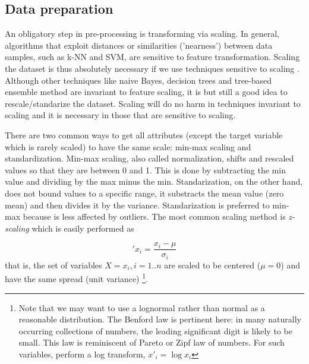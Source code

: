 \documentclass[11pt]{article}
\begin{document}
\subsection{Data preparation}
\label{sse:daprep}

An obligatory step in pre-processing is transforming via scaling. 
In general, algorithms that exploit distances or similarities ('nearness') between data samples, such as k-NN and SVM, are sensitive to feature transformation. 
Scaling the dataset is thus absolutely necessary if we use techniques sensitive to scaling \cite{wu2012foundations}. Although other techniques like naive Bayes, decision trees and tree-based ensemble method are invariant to feature scaling, it is but still a good idea to rescale/standarize the dataset. Scaling will do no harm in techniques invariant to scaling and it is necessary in those that are sensitive to scaling. 

There are two common ways to get all attributes (except the target variable which is rarely scaled) to have the same scale: min-max scaling and standardization.
Min-max scaling, also called normalization, shifts and rescaled values so that they are between 0 and 1. This is done by subtracting the min value and dividing by the max minus the min. 
Standarization, on the other hand, does not bound values to a specific range, it substracts the mean value (zero mean) and then divides it by the variance. 
Standarization is preferred to min-max because is less affected by outliers. The most common scaling method is \emph{z-scaling} which is easily performed as 

\begin{equation} \label{eq:scaling}
\prime{x}_i=\frac{x_i -\mu}{\sigma_i}
\end{equation}
that is, the set of variables $X = x_i, i=1..n$ are scaled to be centered ($\mu=0$) and have the same spread (unit variance) \footnote{Note that we may want to use a lognormal rather than normal as a reasonable distribution. The Benford law is pertinent here: in many naturally occurring collections of numbers, the leading significant digit is likely to be small. This law is reminiscent of Pareto or Zipf law of numbers. For such variables, perform a log transform, $x'_i = \log x_i$}. 
\end{document}

